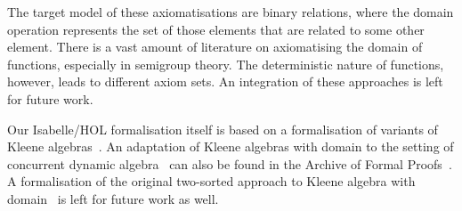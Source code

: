 \documentclass[11pt,a4paper]{article}
\begin{document}
The target model of these axiomatisations are binary relations, where
the domain operation represents the set of those elements that are
related to some other element.  There is a vast amount of literature
on axiomatising the domain of functions, especially in semigroup
theory.  The deterministic nature of functions, however, leads to
different axiom sets.  An integration of these approaches is left for
future work.

Our Isabelle/HOL formalisation itself is based on a formalisation of
variants of Kleene algebras~\cite{ka}.  An adaptation of Kleene
algebras with domain to the setting of concurrent dynamic
algebra~\cite{FurusawaStruth} can also be found in the Archive of
Formal Proofs~\cite{multirelations}. A formalisation of the original
two-sorted approach to Kleene algebra with
domain~\cite{desharnaismoellerstruth06kad} is left for future work as
well.





\end{document}
